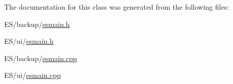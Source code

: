 The documentation for this class was generated from the following files:\begin{DoxyCompactItemize}
\item 
ES/backup/\hyperlink{backup_2esmain_8h}{esmain.h}\item 
ES/ui/\hyperlink{ui_2esmain_8h}{esmain.h}\item 
ES/backup/\hyperlink{backup_2esmain_8cpp}{esmain.cpp}\item 
ES/ui/\hyperlink{ui_2esmain_8cpp}{esmain.cpp}\end{DoxyCompactItemize}
